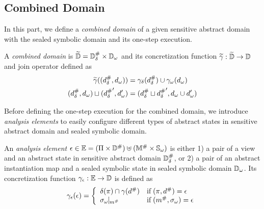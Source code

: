 \subsection{Combined Domain}

In this part, we define a \textit{combined domain} of a given sensitive abstract
domain with the sealed symbolic domain and its one-step execution.
\begin{definition}
  A \textit{combined domain} is $\widetilde{\mathbb{D}} = {\mathbb{D}}^{\#}_\delta \times {\mathbb{D}}_\omega$ and its
  concretization function $\widetilde{\gamma}: \widetilde{\mathbb{D}} \rightarrow \mathbb{D}$ and join
  operator defined as
  \begin{align}
    \widetilde{\gamma}(({{d}^{\#}_\delta}, {d}_\omega)) &= \gamma_\delta({{d}^{\#}_\delta}) \cup
      {\gamma}_\omega({d}_\omega)\\
    ({{d}^{\#}_\delta}, {d}_\omega) \sqcup ({{{d}^{\#}_\delta}}', {d}_\omega') &= ({{d}^{\#}_\delta} \sqcup
      {{{d}^{\#}_\delta}}', {d}_\omega \cup {d}_\omega')
  \end{align}
\end{definition}

Before defining the one-step execution for the combined domain, we introduce
\textit{analysis elements} to easily configure different types of abstract
states in sensitive abstract domain and sealed symbolic domain.
\begin{definition}\label{def:aelem}
  An \textit{analysis element} $\epsilon \in \mathbb{E} = (\Pi \times {\mathbb{D}}^{\#})
  \uplus ({\mathbb{M}}^{\#} \times {\mathbb{S}}_\omega)$ is either 1) a pair of a view and an
  abstract state in sensitive abstract domain ${\mathbb{D}}^{\#}_\delta$, or 2) a pair of an
  abstract instantiation map and a sealed symbolic state in sealed symbolic
  domain ${\mathbb{D}}_\omega$.  Its concretization function $\gamma_{\epsilon}:
  \mathbb{E} \rightarrow \mathbb{D}$ is defined as
  \[
    \gamma_{\epsilon}(\epsilon) = \left\{
      \begin{array}{ll}
        \delta(\pi) \cap \gamma({d}^{\#}) & \text{if} \; (\pi, {d}^{\#}) = \epsilon\\
        {\sigma}_\omega\!\!\mid\!\!_{{m}^{\#}} & \text{if} \; ({m}^{\#}, {\sigma}_\omega) = \epsilon\\
      \end{array}
    \right.
  \]
\end{definition}

